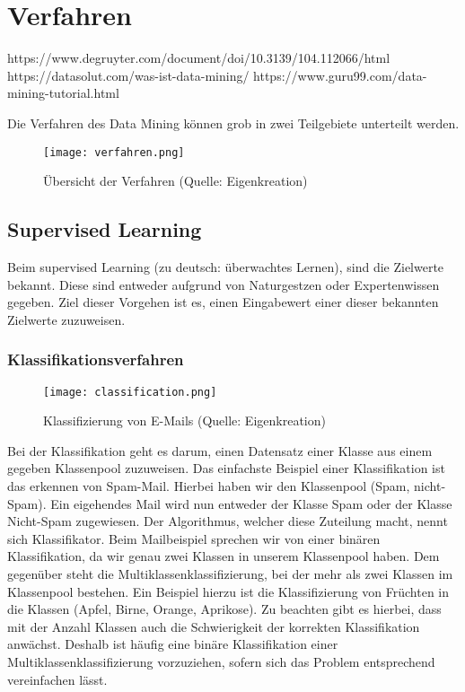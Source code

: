 \chapter{Verfahren}
https://www.degruyter.com/document/doi/10.3139/104.112066/html
https://datasolut.com/was-ist-data-mining/
https://www.guru99.com/data-mining-tutorial.html

Die Verfahren des Data Mining können grob in zwei Teilgebiete unterteilt werden.

\begin{figure}[h!]
		\centering
		\texttt{[image: verfahren.png]}
		\caption{Übersicht der Verfahren (Quelle: Eigenkreation)}
\end{figure}

\section{Supervised Learning}
Beim supervised Learning (zu deutsch: überwachtes Lernen), sind die Zielwerte bekannt. Diese sind entweder aufgrund von Naturgestzen oder Expertenwissen gegeben. Ziel dieser Vorgehen ist es, einen Eingabewert einer dieser bekannten Zielwerte zuzuweisen.

\subsection{Klassifikationsverfahren}
\begin{figure}[h!]
	\centering
	\texttt{[image: classification.png]}
	\caption{Klassifizierung von E-Mails (Quelle: Eigenkreation)}
\end{figure}
Bei der Klassifikation geht es darum, einen Datensatz einer Klasse aus einem gegeben Klassenpool zuzuweisen. Das einfachste Beispiel einer Klassifikation ist das erkennen von Spam-Mail. Hierbei haben wir den Klassenpool (Spam, nicht-Spam). Ein eigehendes Mail wird nun entweder der Klasse Spam oder der Klasse Nicht-Spam zugewiesen. Der Algorithmus, welcher diese Zuteilung macht, nennt sich Klassifikator.
Beim Mailbeispiel sprechen wir von einer binären Klassifikation, da wir genau zwei Klassen in unserem Klassenpool haben. Dem gegenüber steht die Multiklassenklassifizierung, bei der mehr als zwei Klassen im Klassenpool bestehen. Ein Beispiel hierzu ist die Klassifizierung von Früchten in die Klassen (Apfel, Birne, Orange, Aprikose).
Zu beachten gibt es hierbei, dass mit der Anzahl Klassen auch die Schwierigkeit der korrekten Klassifikation anwächst. Deshalb ist häufig eine binäre Klassifikation einer Multiklassenklassifizierung vorzuziehen, sofern sich das Problem entsprechend vereinfachen lässt.


